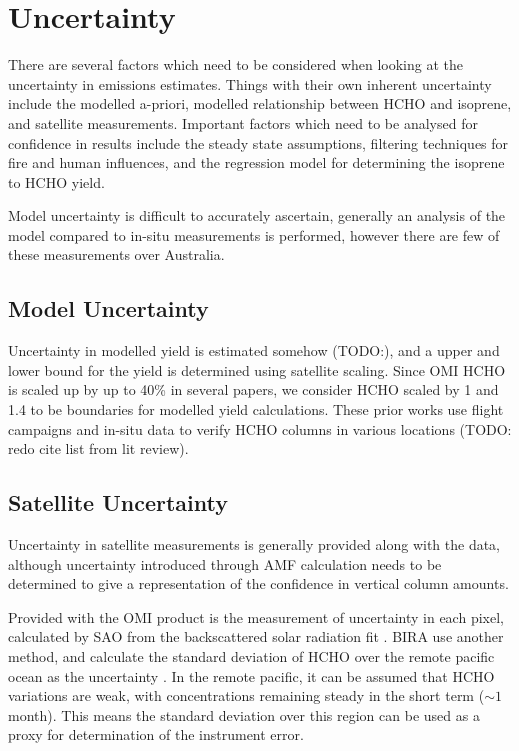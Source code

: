     
\section{Uncertainty}
\label{BioIsop:Uncertainty}

  There are several factors which need to be considered when looking at the uncertainty in emissions estimates.
  Things with their own inherent uncertainty include the modelled a-priori, modelled relationship between HCHO and isoprene, and satellite measurements. 
  Important factors which need to be analysed for confidence in results include the steady state assumptions, filtering techniques for fire and human influences, and the regression model for determining the isoprene to HCHO yield.
  
  Model uncertainty is difficult to accurately ascertain, generally an analysis of the model compared to in-situ measurements is performed, however there are few of these measurements over Australia.
  
  \subsection{Model Uncertainty}
    \label{Model:Uncertainty:Model}
    Uncertainty in modelled yield is estimated somehow (TODO:), and a upper and lower bound for the yield is determined using satellite scaling.
    Since OMI HCHO is scaled up by up to 40\% in several papers, we consider HCHO scaled by 1 and 1.4 to be boundaries for modelled yield calculations.
    These prior works use flight campaigns and in-situ data to verify HCHO columns in various locations (TODO: redo cite list from lit review).
    
    
    
  \subsection{Satellite Uncertainty}
    \label{BioIsop:Uncertianty:Satellite}
    
    Uncertainty in satellite measurements is generally provided along with the data, although uncertainty introduced through AMF calculation needs to be determined to give a representation of the confidence in vertical column amounts.
    
    Provided with the OMI product is the measurement of uncertainty in each pixel, calculated by SAO from the backscattered solar radiation fit \citep{Abad2015,Abad2016}.
    BIRA use another method, and calculate the standard deviation of HCHO over the remote pacific ocean as the uncertainty \citep{DeSmedt2012, DeSmedt2015}.
    In the remote pacific, it can be assumed that HCHO variations are weak, with concentrations remaining steady in the short term ($\sim 1$ month).
    This means the standard deviation over this region can be used as a proxy for determination of the instrument error.
    
